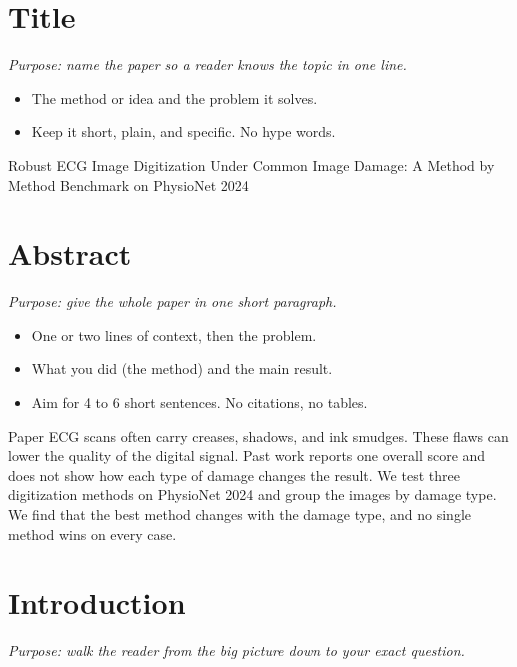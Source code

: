 \documentclass[11pt]{article}
\begin{document}
\section{Title}
\textit{Purpose: name the paper so a reader knows the topic in one line.}

\begin{itemize}
\item The \textcolor{cMethod}{method or idea} and the \textcolor{cProblem}{problem} it solves.
\item Keep it short, plain, and specific. No hype words.
\end{itemize}


\textcolor{cMethod}{Robust ECG Image Digitization} \textcolor{cProblem}{Under Common Image Damage}: A Method by Method Benchmark on PhysioNet 2024

\section{Abstract}
\textit{Purpose: give the whole paper in one short paragraph.}

\begin{itemize}
\item One or two lines of context, then the \textcolor{cProblem}{problem}.
\item What you did (the \textcolor{cMethod}{method}) and the main \textcolor{cResult}{result}.
\item Aim for 4 to 6 short sentences. No citations, no tables.
\end{itemize}


\textcolor{cProblem}{Paper ECG scans often carry creases, shadows, and ink smudges.} These flaws can lower the quality of the digital signal. \textcolor{cGap}{Past work reports one overall score and does not show how each type of damage changes the result.} \textcolor{cMethod}{We test three digitization methods on PhysioNet 2024 and group the images by damage type.} \textcolor{cResult}{We find that the best method changes with the damage type, and no single method wins on every case.}

\section{Introduction}
\textit{Purpose: walk the reader from the big picture down to your exact question.}
\end{document}
